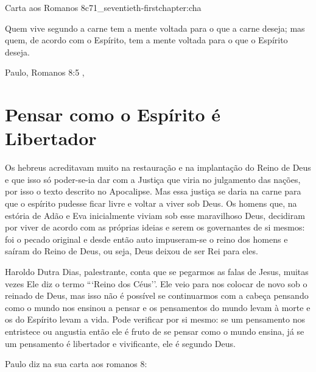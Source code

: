 \begin{chapterpage}{Carta aos Romanos 8}{c71_seventieth-firstchapter:cha}
 
\begin{myquotation}Quem vive segundo a carne tem a mente voltada para o que a carne deseja; mas quem, de acordo com o Espírito, tem a mente voltada para o que o Espírito deseja.
\par\vspace*{15mm}
\mbox{}\hfill \emdash{}Paulo, Romanos 8:5
, %
\par\end{myquotation}

\end{chapterpage}



\section{Pensar como o Espírito é Libertador}\label{c1_basicformatting:sec}

\emdash{}Os hebreus acreditavam muito na restauração e na implantação do Reino de Deus e que isso só poder-se-ia dar com a Justiça que viria no julgamento das nações, por isso o texto descrito no Apocalipse. Mas essa justiça se daria na carne para que o espírito pudesse ficar livre e voltar a viver sob Deus. Os homens que, na estória de Adão e Eva inicialmente viviam sob esse maravilhoso Deus, decidiram por viver de acordo com as próprias ideias e serem os governantes de si mesmos: foi o pecado original e desde então auto impuseram-se o reino dos homens e saíram do Reino de Deus, ou seja, Deus deixou de ser Rei para eles.

\emdash{}Haroldo Dutra Dias, palestrante, conta que se pegarmos as falas de Jesus, muitas vezes Ele diz o termo ```Reino dos Céus''. Ele veio para nos colocar de novo sob o reinado de Deus, mas isso não é possível se continuarmos com a cabeça pensando como o mundo nos ensinou a pensar e os pensamentos do mundo levam à morte e os do Espírito levam a vida. Pode verificar por si mesmo: se um pensamento nos entristece ou angustia então ele é fruto de se pensar como o mundo ensina, já se um pensamento é libertador e vivificante, ele é segundo Deus.

\emdash{}Paulo diz na sua carta aos romanos 8:

